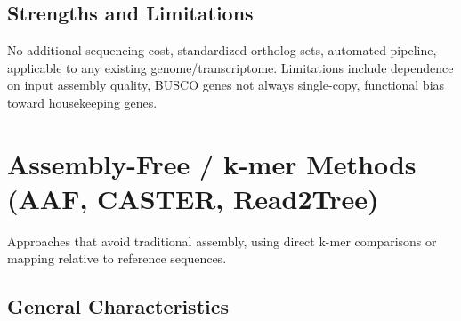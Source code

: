 \subsection{Strengths and Limitations}

No additional sequencing cost, standardized ortholog sets, automated pipeline, applicable to any existing genome/transcriptome. Limitations include dependence on input assembly quality, BUSCO genes not always single-copy, functional bias toward housekeeping genes.

\textcite{simao2015, waterhouse2018, manni2021, sahbou2022}

\section{Assembly-Free / k-mer Methods (AAF, CASTER, Read2Tree)}

Approaches that avoid traditional assembly, using direct k-mer comparisons or mapping relative to reference sequences.

\subsection{General Characteristics}

